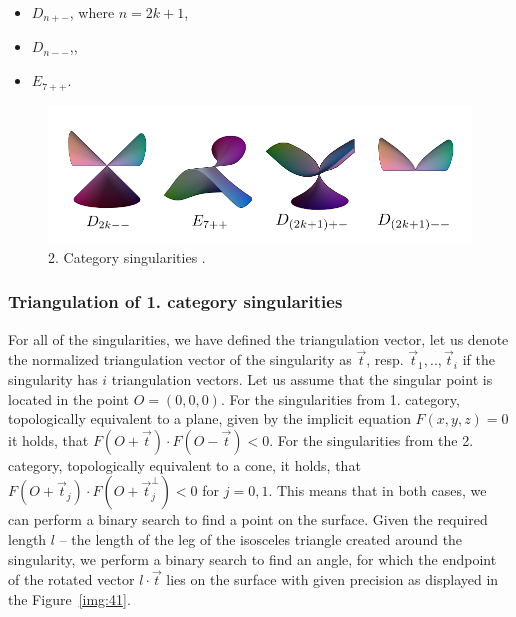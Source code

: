 \begin{enumerate}
    \begin{itemize}
        \item $D_{n+-}$, where $n=2k+1$,
        \item $D_{n--}$,,
        \item $E_{7++}$.
    \end{itemize}
    \begin{figure}
        \centerline{\includegraphics[scale=0.5]{images/img43}}
        \caption[2. Category singularities]
        {2. Category singularities \cite{morris2003client}.}
        \label{img:43}
    \end{figure}
\end{enumerate}

\subsubsection*{Triangulation of 1. category singularities}
For all of the singularities, we have defined the triangulation vector,
let us denote the normalized triangulation vector of the singularity 
as $\vec{t}$, resp. $\vec{t}_1, .., \vec{t}_i$ if the 
singularity has $i$ triangulation vectors.
Let us assume that the singular point is located in the point $O = (0, 0, 0).$
For the singularities from 1. category, 
topologically equivalent to a plane, given by the implicit
equation $F(x, y, z) = 0$ it holds, that $F(O+\vec{t}) \cdot F(O-\vec{t})<0$.
For the singularities from the 2. category, topologically equivalent to a cone,
it holds, that $F(O+\vec{t}_j) \cdot F(O+\vec{t}_j^\bot) <0$ for $j = 0, 1$.
This means that in both cases, we can perform a binary search to find a point on 
the surface.
Given the required length $l$ -- the length of the leg of the isosceles triangle 
created around the singularity, we perform a binary search to find
an angle, for which the endpoint of the rotated vector $l \cdot \vec{t}$ lies on 
the surface with given precision as displayed in the Figure~\ref{img:41}.

